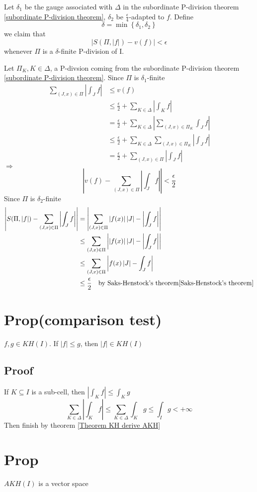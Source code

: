 \documentclass{book}
\newcommand{\abs}[1]{\left\lvert #1 \right\rvert}
\newcommand{\set}[1]{\left\{#1\right\}}
\begin{document}
Let $\delta_1$ be the gauge associated with $\Delta$ in the subordinate P-division theorem \ref{subordinate P-division theorem}, $\delta_2$ be $\frac{\epsilon}4$-adapted to $f$. Define $$\delta=\min\set{\delta_1,\delta_2}$$
we claim that
$$\abs{S(\Pi,\abs{f})-v(f)}<\epsilon$$
whenever $\Pi$ is a $\delta$-finite P-division of I.

Let $\Pi_K,K\in \Delta$, a P-divsion coming from the subordinate P-division theorem \ref{subordinate P-division theorem}. Since $\Pi$ is $\delta_1$-finite
$$
\begin{aligned}
    \sum\limits_{(J,x)\in \Pi}\abs{\int_Jf} &\leq v(f)\\ &\leq \frac{\epsilon}2+\sum\limits_{K\in \Delta}\abs{\int_Kf}\\
    &=\frac{\epsilon}2+\sum\limits_{K\in \Delta}\abs{\sum\limits_{(J,x)\in \Pi_K}\int_Jf}\\
    &\leq \frac{\epsilon}2+\sum\limits_{K\in \Delta}\sum\limits_{(J,x)\in \Pi_K}\abs{\int_Jf}\\
    &=\frac{\epsilon}2+\sum\limits_{(J,x)\in \Pi}\abs{\int_Jf}
\end{aligned}$$
$\Rightarrow$$$\abs{v(f)-\sum\limits_{(J,x)\in \Pi}\abs{\int_Jf}}<\frac{\epsilon}2$$
Since $\Pi$ is $\delta_2$-finite
$$\begin{aligned}
    \abs{S(\Pi,\abs f)-\sum\limits_{(J,x)\in \Pi}\abs{\int_Jf}} &=\abs{\sum\limits_{(J,x)\in \Pi}\abs{f(x)}\abs J-\abs{\int_J f}}\\
    &\leq\sum\limits_{(J,x)\in \Pi}\abs{\abs{f(x)}\abs J-\abs{\int_J f}}\\
    &\leq\sum\limits_{(J,x)\in \Pi}\abs{f(x)\abs J-\int_J f}\\
    &\leq\frac{\epsilon}2\quad \text{by Saks-Henstock's theorem}\ref{Saks-Henstock's theorem}
\end{aligned}$$
\section{Prop(comparison test)}
$f,g\in KH(I)$. If $\abs f\leq g$, then $\abs f\in KH(I)$
\subsection*{Proof}
If $K\subseteq I$ is a sub-cell, then $\abs{\int_Kf}\leq\int_Kg$
$$\sum\limits_{K\in \Delta}\abs{\int_Kf}\leq \sum\limits_{K\in \Delta}\int_Kg\leq\int_Ig<+\infty$$
Then finish by theorem \ref{Theorem KH derive AKH}
\section{Prop}
$AKH(I)$ is a vector space
\end{document}
